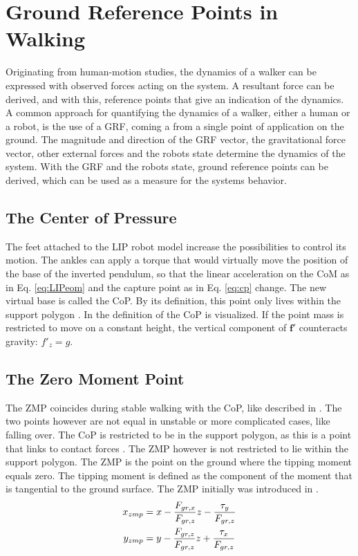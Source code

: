 \section{Ground Reference Points in Walking}\label{sec:grp}
Originating from human-motion studies, the dynamics of a walker can be expressed with observed forces acting on the system. A resultant force can be derived, and with this, reference points that give an indication of the dynamics.\\
A common approach for quantifying the dynamics of a walker, either a human or a robot, is the use of a \ac{GRF}, coming a from a single point of application on the ground. The magnitude and direction of the \ac{GRF} vector, the gravitational force vector, other external forces and the robots state determine the dynamics of the system. With the \ac{GRF} and the robots state, ground reference points can be derived, which can be used as a measure for the systems behavior.

\subsection{The Center of Pressure}
The feet attached to the \ac{LIP} robot model increase the possibilities to control its motion. The ankles can apply a torque that would virtually move the position of the base of the inverted pendulum, so that the linear acceleration on the \ac{CoM} as in Eq. \eqref{eq:LIPeom} and the capture point as in Eq. \eqref{eq:cp} change. The new virtual base is called the \ac{CoP}. By its definition, this point only lives within the support polygon \cite{vukobratovic2004zero}. In  the definition of the \ac{CoP} is visualized. If the point mass is restricted to move on a constant height, the vertical component of $\boldsymbol{f'}$ counteracts gravity: $f'_z=g$. 

\subsection{The Zero Moment Point}
The \ac{ZMP} coincides during stable walking with the \ac{CoP}, like described in \cite{vukobratovic2004zero}. The two points however are not equal in unstable or more complicated cases, like falling over.  The \ac{CoP} is restricted to be in the support polygon, as this is a point that links to contact forces \cite{sardain2004forces}. The \ac{ZMP} however is not restricted to lie within the support polygon. The \ac{ZMP} is the point on the ground where the tipping moment equals zero. The tipping moment is defined as the component of the moment that is tangential to the ground surface. The \ac{ZMP} initially was introduced in \cite{vukobratovic1969contribution}.
\begin{align}
    x_{zmp}&=x-\frac{F_{gr,x}}{F_{gr,z}}z-\frac{\tau_y}{F_{gr,z}}\\
    y_{zmp}&=y-\frac{F_{gr,z}}{F_{gr,z}}z+\frac{\tau_x}{F_{gr,z}}
\end{align}

